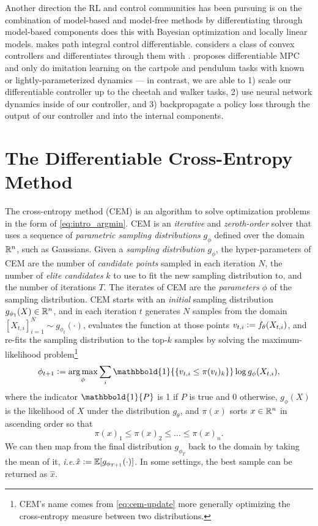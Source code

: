 \documentclass{article}
\newcommand{\ie}{{\it i.e.}\xspace}
\begin{document}
Another direction the RL and control communities has been pursuing is
on the combination of model-based and model-free methods by
differentiating through model-based components
\citet{bansal2017goal} does this with Bayesian optimization and
locally linear models.
\citet{okada2017path,pereira2018mpc} makes path integral control
\citep{theodorou2010generalized} differentiable.
\citet{agrawal2019learning} considers a class of convex controllers
and differentiates through them with \citet{agrawal2019differentiable}.
\citet{amos2018differentiable} proposes differentiable MPC
and only do imitation learning on the cartpole
and pendulum tasks with known or lightly-parameterized dynamics ---
in contrast, we are able to
1) scale our differentiable controller up to the cheetah
and walker tasks,
2) use neural network dynamics inside of our controller, and
3) backpropagate a policy loss through the output of
our controller and into the internal components.

\section{The Differentiable Cross-Entropy Method}
The cross-entropy method (CEM) \citep{rubinstein1997optimization,de2005tutorial}
is an algorithm to solve optimization problems
in the form of \cref{eq:intro_argmin}.
CEM is an \emph{iterative} and \emph{zeroth-order} solver
that uses a sequence of \emph{parametric sampling distributions} $g_\phi$
defined over the domain ${\mathbb{R}}^n$, such as Gaussians.
Given a \emph{sampling distribution} $g_\phi$, the hyper-parameters of CEM are
the number of \emph{candidate points} sampled in each iteration $N$,
the number of \emph{elite candidates} $k$ to use to
fit the new sampling distribution to, and
the number of iterations $T$.
The iterates of CEM are the \emph{parameters} $\phi$ of the
sampling distribution.
CEM starts with an \emph{initial} sampling distribution
$g_{\phi_1}(X)\in{\mathbb{R}}^n$,
and in each iteration $t$ generates $N$ samples from the domain
$\left[X_{t,i}\right]_{i=1}^N \sim g_{\phi_t}(\cdot)$,
evaluates the function at those points $v_{t,i}\vcentcolon= f_\theta(X_{t,i})$,
and re-fits the sampling distribution to the top-$k$ samples by
solving the maximum-likelihood problem\footnote{%
CEM's name comes from
\cref{eq:cem-update} more generally optimizing the
cross-entropy measure between two distributions.}
\begin{equation}
  \phi_{t+1} \defeq
    \argmax_\phi \sum_i \mathbbold{1}{\{v_{t,i} \leq \pi(v_t)_k\}} \log g_\phi(X_{t,i}),
   \label{eq:cem-update}
\end{equation}
where the indicator $\mathbbold{1}\{P\}$ is 1 if $P$ is true and 0 otherwise,
$g_\phi(X)$ is the likelihood of $X$ under the distribution
$g_\theta$,
and $\pi(x)$ sorts $x\in{\mathbb{R}}^n$ in ascending order so that
$$\pi(x)_1 \leq \pi(x)_2 \leq \ldots \leq \pi(x)_n.$$
We can then map from the final distribution $g_{\phi_T}$ back
to the domain by taking the mean of it,
\ie $\hat x \vcentcolon= \mathbb{E}[g_{\phi_{T+1}}(\cdot)]$.
In some settings, the best sample can be returned as
$\hat x$.
\end{document}
